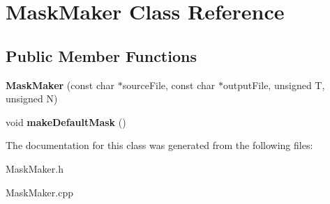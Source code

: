 \hypertarget{class_mask_maker}{\section{Mask\-Maker Class Reference}
\label{class_mask_maker}
}
\subsection*{Public Member Functions}
\begin{DoxyCompactItemize}
\item 
\hypertarget{class_mask_maker_a94e5e9132a4dd3e4e1d8d1cdc8e0fcd2}{{\bfseries Mask\-Maker} (const char $\ast$source\-File, const char $\ast$output\-File, unsigned T, unsigned N)}\label{class_mask_maker_a94e5e9132a4dd3e4e1d8d1cdc8e0fcd2}

\item 
\hypertarget{class_mask_maker_a0fe6264b064fa722664f2eefb73af9e1}{void {\bfseries make\-Default\-Mask} ()}\label{class_mask_maker_a0fe6264b064fa722664f2eefb73af9e1}

\end{DoxyCompactItemize}


The documentation for this class was generated from the following files\-:\begin{DoxyCompactItemize}
\item 
Mask\-Maker.\-h\item 
Mask\-Maker.\-cpp\end{DoxyCompactItemize}
